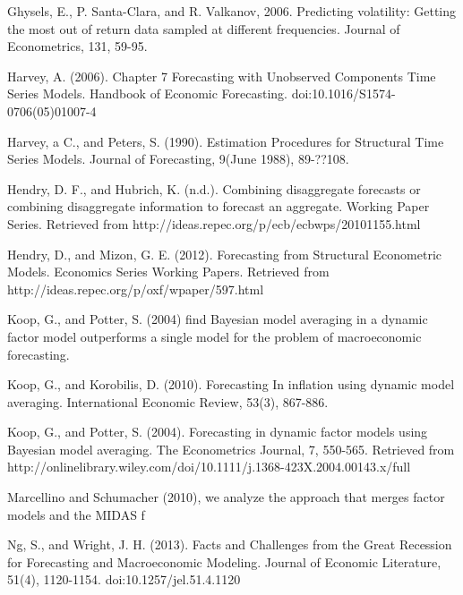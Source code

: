 Ghysels, E., P. Santa-Clara, and R. Valkanov, 2006. Predicting volatility: Getting the most out of return data sampled at different frequencies. Journal of Econometrics, 131, 59-95.



Harvey, A. (2006). Chapter 7 Forecasting with Unobserved Components Time Series Models. Handbook of Economic Forecasting. doi:10.1016/S1574-0706(05)01007-4



Harvey, a C., and Peters, S. (1990). Estimation Procedures for Structural Time Series Models. Journal of Forecasting, 9(June 1988), 89-??108.



Hendry, D. F., and Hubrich, K. (n.d.). Combining disaggregate forecasts or combining disaggregate information to forecast an aggregate. Working Paper Series. Retrieved from http://ideas.repec.org/p/ecb/ecbwps/20101155.html



Hendry, D., and Mizon, G. E. (2012). Forecasting from Structural Econometric Models. Economics Series Working Papers. Retrieved from http://ideas.repec.org/p/oxf/wpaper/597.html











Koop, G., and Potter, S. (2004) find Bayesian model averaging in a dynamic factor model outperforms a single model for the problem of macroeconomic forecasting. 



Koop, G., and Korobilis, D. (2010). Forecasting In inflation using dynamic model averaging. International Economic Review, 53(3), 867-886.







Koop, G., and Potter, S. (2004). Forecasting in dynamic factor models using Bayesian model averaging. The Econometrics Journal, 7, 550-565. Retrieved from http://onlinelibrary.wiley.com/doi/10.1111/j.1368-423X.2004.00143.x/full



Marcellino and Schumacher (2010), we analyze the approach that merges factor models and the MIDAS f






Ng, S., and Wright, J. H. (2013). Facts and Challenges from the Great Recession for Forecasting and Macroeconomic Modeling. Journal of Economic Literature, 51(4), 1120-1154. doi:10.1257/jel.51.4.1120





